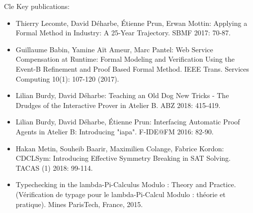 \begin{sitedescription}{Cle}
Key publications:

\begin{itemize}
\item Thierry Lecomte, David Déharbe, Étienne Prun, Erwan Mottin:
Applying a Formal Method in Industry: A 25-Year Trajectory. SBMF 2017: 70-87.
\item Guillaume Babin, Yamine Aït Ameur, Marc Pantel:
Web Service Compensation at Runtime: Formal Modeling and Verification Using the Event-B Refinement and Proof Based Formal Method. IEEE Trans. Services Computing 10(1): 107-120 (2017).
\item Lilian Burdy, David Déharbe:
Teaching an Old Dog New Tricks - The Drudges of the Interactive Prover in Atelier B. ABZ 2018: 415-419.
\item Lilian Burdy, David Déharbe, Étienne Prun:
Interfacing Automatic Proof Agents in Atelier B: Introducing "iapa". F-IDE@FM 2016: 82-90.
\item Hakan Metin, Souheib Baarir, Maximilien Colange, Fabrice Kordon:
CDCLSym: Introducing Effective Symmetry Breaking in SAT Solving. TACAS (1) 2018: 99-114.
\item Typechecking in the lambda-Pi-Calculus Modulo : Theory and Practice. (Vérification de typage pour le lambda-Pi-Calcul Modulo : théorie et pratique). Mines ParisTech, France, 2015.
\end{itemize}

\end{sitedescription}

